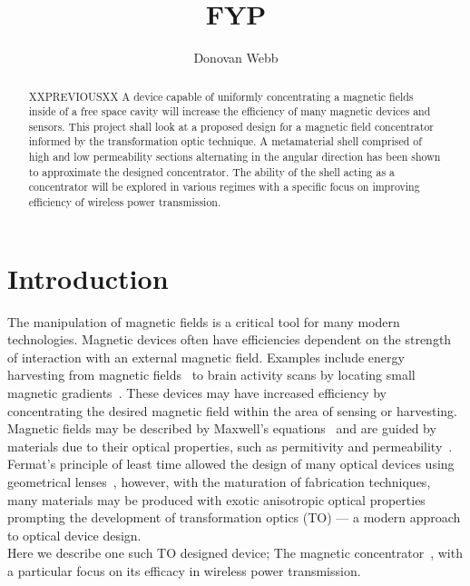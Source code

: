 \documentclass[11pt]{iopart}
\begin{document}
\title[]{FYP}

\author{Donovan Webb}

\address{Department of Physics,
University of Bath, Bath BA2 7AY, United Kingdom}

\begin{abstract}

XXPREVIOUSXX
A device capable of uniformly concentrating a magnetic fields inside of
a free space cavity will increase the efficiency of many magnetic
devices and sensors.  This project shall look at a proposed design for
a magnetic field concentrator informed by the transformation optic
technique. A metamaterial shell comprised of high and low permeability
sections alternating in the angular direction has been shown to
approximate the designed concentrator\cite{N2014}. The ability of the shell acting
as a concentrator will be explored in various regimes with a specific
focus on improving efficiency of wireless power transmission.

\end{abstract}
\section{Introduction}

The manipulation of magnetic fields is a critical tool for many modern
technologies. Magnetic devices often have efficiencies dependent on
the strength of interaction with an external magnetic field. Examples
include energy harvesting from magnetic fields~\cite{HARVESTING} to
brain activity scans by locating small magnetic
gradients~\cite{BRAIN}. These devices may have increased efficiency by
concentrating the desired magnetic field within the area of sensing or
harvesting. \\ Magnetic fields may be described by Maxwell's
equations~\cite{MAXWELL} and are guided by materials due to their
optical properties, such as permitivity and permeability~\cite{OPTICAL
  PROPERITES}. Fermat's principle of least time allowed the design
of many optical devices using geometrical lenses~\cite{FERMAT},
however, with the maturation of fabrication techniques, many materials
may be produced with exotic anisotropic optical properties~\cite{META}
prompting the development of transformation optics (TO) --- a modern
approach to optical device design.\\ Here we describe one such TO
designed device; The magnetic concentrator~\cite{PRATT}, with a particular focus
on its efficacy in wireless power transmission. \\ 
\end{document}
